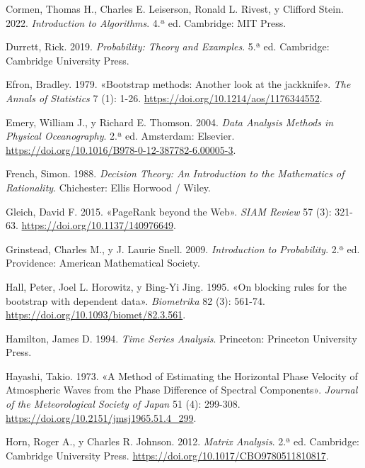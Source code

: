 \documentclass[
  spanish,
  us-letterpaper,
]{scrreprt}
\newlength{\cslhangindent}
\newenvironment{CSLReferences}[2] %
 {\begin{list}{}{%
  \setlength{\itemindent}{0pt}
  \setlength{\leftmargin}{0pt}
  \setlength{\parsep}{0pt}
  \ifodd #1
   \setlength{\leftmargin}{\cslhangindent}
   \setlength{\itemindent}{-1\cslhangindent}
  \fi
  \setlength{\itemsep}{#2\baselineskip}}}
 {\end{list}}
\numberwithin{equation}{section}
\begin{document}
\begin{CSLReferences}{1}{0}
Cormen, Thomas H., Charles E. Leiserson, Ronald L. Rivest, y Clifford
Stein. 2022. \emph{Introduction to Algorithms}. 4.ª ed. Cambridge: MIT
Press.

Durrett, Rick. 2019. \emph{Probability: Theory and Examples}. 5.ª ed.
Cambridge: Cambridge University Press.

Efron, Bradley. 1979. {«Bootstrap methods: Another look at the
jackknife»}. \emph{The Annals of Statistics} 7 (1): 1-26.
\url{https://doi.org/10.1214/aos/1176344552}.

Emery, William J., y Richard E. Thomson. 2004. \emph{Data Analysis
Methods in Physical Oceanography}. 2.ª ed. Amsterdam: Elsevier.
\url{https://doi.org/10.1016/B978-0-12-387782-6.00005-3}.

French, Simon. 1988. \emph{Decision Theory: An Introduction to the
Mathematics of Rationality}. Chichester: Ellis Horwood / Wiley.

Gleich, David F. 2015. {«PageRank beyond the Web»}. \emph{SIAM Review}
57 (3): 321-63. \url{https://doi.org/10.1137/140976649}.

Grinstead, Charles M., y J. Laurie Snell. 2009. \emph{Introduction to
Probability}. 2.ª ed. Providence: American Mathematical Society.

Hall, Peter, Joel L. Horowitz, y Bing-Yi Jing. 1995. {«On blocking rules
for the bootstrap with dependent data»}. \emph{Biometrika} 82 (3):
561-74. \url{https://doi.org/10.1093/biomet/82.3.561}.

Hamilton, James D. 1994. \emph{Time Series Analysis}. Princeton:
Princeton University Press.

Hayashi, Takio. 1973. {«A Method of Estimating the Horizontal Phase
Velocity of Atmospheric Waves from the Phase Difference of Spectral
Components»}. \emph{Journal of the Meteorological Society of Japan} 51
(4): 299-308. \url{https://doi.org/10.2151/jmsj1965.51.4_299}.

Horn, Roger A., y Charles R. Johnson. 2012. \emph{Matrix Analysis}. 2.ª
ed. Cambridge: Cambridge University Press.
\url{https://doi.org/10.1017/CBO9780511810817}.


\end{CSLReferences}
\end{document}
